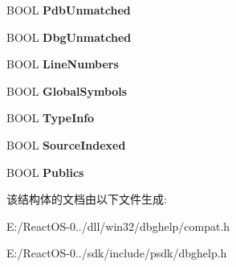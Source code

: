\begin{DoxyCompactItemize}
B\+O\+OL {\bfseries Pdb\+Unmatched}
\item 
\mbox{\label{struct___i_m_a_g_e_h_l_p___m_o_d_u_l_e64_a1300d534ef705264cee53bcd8e019cc6}} 
B\+O\+OL {\bfseries Dbg\+Unmatched}
\item 
\mbox{\label{struct___i_m_a_g_e_h_l_p___m_o_d_u_l_e64_ad990a6560c6eb20f853c1335c68503c6}} 
B\+O\+OL {\bfseries Line\+Numbers}
\item 
\mbox{\label{struct___i_m_a_g_e_h_l_p___m_o_d_u_l_e64_ae838fd5f1d42d4952083c6bfb18a0077}} 
B\+O\+OL {\bfseries Global\+Symbols}
\item 
\mbox{\label{struct___i_m_a_g_e_h_l_p___m_o_d_u_l_e64_a60acae712cda99b1a1249e738e41a942}} 
B\+O\+OL {\bfseries Type\+Info}
\item 
\mbox{\label{struct___i_m_a_g_e_h_l_p___m_o_d_u_l_e64_a321443930aa1a7d457b9974ce25ad810}} 
B\+O\+OL {\bfseries Source\+Indexed}
\item 
\mbox{\label{struct___i_m_a_g_e_h_l_p___m_o_d_u_l_e64_a5692cdd59d94201a718095dab8b86383}} 
B\+O\+OL {\bfseries Publics}
\end{DoxyCompactItemize}


该结构体的文档由以下文件生成\+:\begin{DoxyCompactItemize}
\item 
E\+:/\+React\+O\+S-\/0../dll/win32/dbghelp/compat.\+h\item 
E\+:/\+React\+O\+S-\/0../sdk/include/psdk/dbghelp.\+h\end{DoxyCompactItemize}
